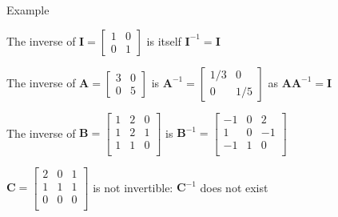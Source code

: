 \documentclass[ignorenonframetext,]{beamer}
\newcommand{\vv}[1]{\boldsymbol{#1}}
\begin{document}
\begin{frame}{Example}
\protect\hypertarget{example-1}{}

The inverse of \(\vv{I} = \begin{bmatrix} 1 &0 \\ 0 & 1 \end{bmatrix}\)
is itself \(\vv{I}^{-1} =\vv{I}\)

\bigskip

The inverse of \(\vv{A} = \begin{bmatrix} 3& 0 \\ 0 & 5\end{bmatrix}\)
is \(\vv{A}^{-1} = \begin{bmatrix} 1/3& 0 \\ 0 & 1/5\end{bmatrix}\) as
\(\vv{AA}^{-1} = \vv{I}\)

\bigskip

The inverse of
\(\vv{B} = \begin{bmatrix}1&2&0 \\1&2&1 \\1&1&0 \\\end{bmatrix}\) is
\(\vv{B}^{-1}=\begin{bmatrix}-1&0&2 \\1&0&-1 \\-1&1&0 \\\end{bmatrix}\)
\bigskip

\(\vv{C} = \begin{bmatrix}2&0&1 \\1&1&1 \\0&0&0 \\\end{bmatrix}\) is not
invertible: \(\vv{C}^{-1}\) does not exist

\end{frame}
\end{document}
